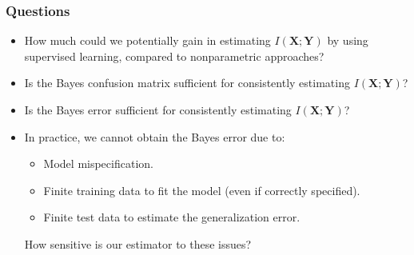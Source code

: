 \documentclass{beamer}
\newcommand{\bX}{\boldsymbol{X}}
\newcommand{\bY}{\boldsymbol{Y}}
\begin{document}
\begin{frame}
\frametitle{Questions}
\begin{itemize}
\item How much could we potentially gain in estimating $I(\bX; \bY)$ by using supervised learning, compared to nonparametric approaches?
\item Is the Bayes confusion matrix sufficient for consistently estimating $I(\bX; \bY)$?
\item Is the Bayes error sufficient for consistently estimating $I(\bX; \bY)$?
\item In practice, we cannot obtain the Bayes error due to:
\begin{itemize}
\item Model mispecification.
\item Finite training data to fit the model (even if correctly specified).
\item Finite test data to estimate the generalization error.
\end{itemize}
How sensitive is our estimator to these issues?
\end{itemize}
\end{frame}
\end{document}
